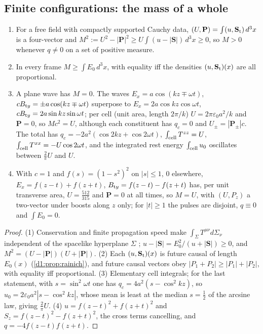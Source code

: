\subsection{Finite configurations: the mass of a whole}
\label{d1:sec:whole}

\begin{proposition}
\label{d1:prop:whole}
\begin{enumerate}
\item For a free field with compactly supported Cauchy data, $(U,\mathbf P)=\int(u,\mathbf S_{\rm t})\,d^3x$ is a four-vector and
$M^2:=U^2-|\mathbf P|^2\ge U\int(u-|\mathbf S|)\,d^3x\ge0$, so $M>0$ whenever $q\neq0$ on a set of positive measure.
\item In every frame $M\ge\int E_0\,d^3x$, with equality iff the densities $(u,\mathbf S_{\rm t})(x)$ are all proportional.
\item A plane wave has $M=0$. The waves $E_x=a\cos(kz\mp\omega t)$, $cB_{{\rm t}y}=\pm a\cos(kz\mp\omega t)$ superpose to $E_x=2a\cos kz\cos\omega t$,
$cB_{{\rm t}y}=2a\sin kz\sin\omega t$; per cell (unit area, length $2\pi/k$) $U=2\pi\varepsilon_0a^2/k$ and $\mathbf P=0$, so $Mc^2=U$, although each
constituent has $q_c=0$ and $U_\pm=|\mathbf P_\pm|c$. The total has $q_c=-2a^2(\cos2kz+\cos2\omega t)$, $\int_{\rm cell}T^{zz}=U$,
$\int_{\rm cell}T^{xx}=-U\cos2\omega t$, and the integrated rest energy $\int_{\rm cell}u_0$ oscillates between $\tfrac2\pi U$ and $U$.
\item With $c=1$ and $f(s)=(1-s^2)^2$ on $|s|\le1$, $0$ elsewhere, $E_x=f(z-t)+f(z+t)$, $B_{{\rm t}y}=f(z-t)-f(z+t)$ has, per unit transverse area,
$U=\tfrac{512}{315}$ and $\mathbf P=0$ at all times, so $M=U$, with $(U,P_z)$ a two-vector under boosts along $z$ only; for $|t|\ge1$ the pulses are
disjoint, $q\equiv0$ and $\int E_0=0$.
\end{enumerate}
\end{proposition}

\begin{proof}
(1) Conservation and finite propagation speed make $\int_\Sigma T^{\mu\nu}d\Sigma_\nu$ independent of the spacelike hyperplane $\Sigma$
\cite{Laue1911}; $u-|\mathbf S|=E_0^2/(u+|\mathbf S|)\ge0$, and $M^2=(U-|\mathbf P|)(U+|\mathbf P|)$. (2) Each $(u,\mathbf S_{\rm t})(x)$ is future causal of
length $E_0(x)$ (\cref{d1:prop:rainich}), and future causal vectors obey $|P_1+P_2|\ge|P_1|+|P_2|$, with equality iff proportional. (3) Elementary
cell integrals; for the last statement, with $s=\sin^2\omega t$ one has $q_c=4a^2(s-\cos^2kz)$, so $u_0=2\varepsilon_0a^2|s-\cos^2kz|$, whose mean is
least at the median $s=\tfrac12$ of the arcsine law, giving $\tfrac2\pi U$. (4) $u=f(z-t)^2+f(z+t)^2$ and $S_z=f(z-t)^2-f(z+t)^2$, the cross terms
cancelling, and $q=-4f(z-t)f(z+t)$.
\end{proof}

